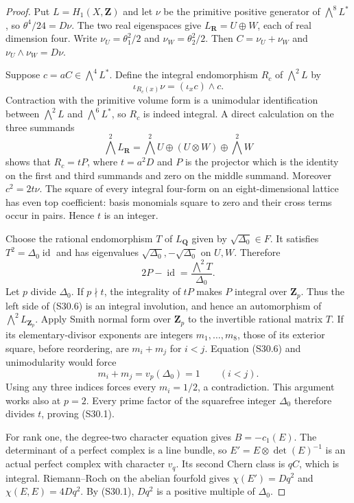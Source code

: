 \begin{proof}
Put $L=H_1(X,\mathbf Z)$ and let $\nu$ be the primitive
positive generator of $\bigwedge^8L^*$, so
$\theta^4/24=D\nu$. The two real eigenspaces give
$L_{\mathbf R}=U\oplus W$, each of real dimension four.
Write $\nu_U=\theta_1^2/2$ and $\nu_W=\theta_2^2/2$.
Then $C=\nu_U+\nu_W$ and $\nu_U\wedge\nu_W=D\nu$.

Suppose $c=aC\in\bigwedge^4L^*$. Define the integral
endomorphism $R_c$ of $\bigwedge^2L$ by
\[
 \iota_{R_c(x)}\nu=(\iota_xc)\wedge c.
 \tag{S30.5}
\]
Contraction with the primitive volume form is a
unimodular identification between
$\bigwedge^2L$ and $\bigwedge^6L^*$, so $R_c$ is indeed
integral. A direct calculation on the three summands
\[
 \bigwedge^2L_{\mathbf R}
  =\bigwedge^2U\oplus(U\otimes W)\oplus\bigwedge^2W
\]
shows that $R_c=tP$, where $t=a^2D$ and $P$ is the
projector which is the identity on the first and third
summands and zero on the middle summand.
Moreover $c^2=2t\nu$. The square of every integral
four-form on an eight-dimensional lattice has even top
coefficient: basis monomials square to zero and their
cross terms occur in pairs. Hence $t$ is an integer.

Choose the rational endomorphism $T$ of $L_{\mathbf Q}$
given by $\sqrt{\Delta_0}\in F$. It satisfies
$T^2=\Delta_0\operatorname{id}$ and has eigenvalues
$\sqrt{\Delta_0},-\sqrt{\Delta_0}$ on $U,W$. Therefore
\[
 2P-\operatorname{id}
      =\frac{\bigwedge^2T}{\Delta_0}.
 \tag{S30.6}
\]
Let $p$ divide $\Delta_0$. If $p\nmid t$, the integrality
of $tP$ makes $P$ integral over $\mathbf Z_p$.
Thus the left side of (S30.6) is an integral involution,
and hence an automorphism of $\bigwedge^2L_{\mathbf Z_p}$.
Apply Smith normal form over $\mathbf Z_p$ to the
invertible rational matrix $T$. If its elementary-divisor
exponents are integers $m_1,\ldots,m_8$, those of its
exterior square, before reordering, are
$m_i+m_j$ for $i<j$. Equation (S30.6) and unimodularity
would force
\[
 m_i+m_j=v_p(\Delta_0)=1\qquad(i<j).
 \tag{S30.7}
\]
Using any three indices forces every $m_i=1/2$, a
contradiction. This argument works also at $p=2$.
Every prime factor of the squarefree integer $\Delta_0$
therefore divides $t$, proving (S30.1).

For rank one, the degree-two character equation gives
$B=-c_1(E)$. The determinant of a perfect complex is a
line bundle, so $E'=E\otimes\det(E)^{-1}$ is an actual
perfect complex with character $v_q$. Its second Chern
class is $qC$, which is integral. Riemann--Roch on the
abelian fourfold gives $\chi(E')=Dq^2$ and
$\chi(E,E)=4Dq^2$. By (S30.1), $Dq^2$ is a positive
multiple of $\Delta_0$.


\end{proof}
